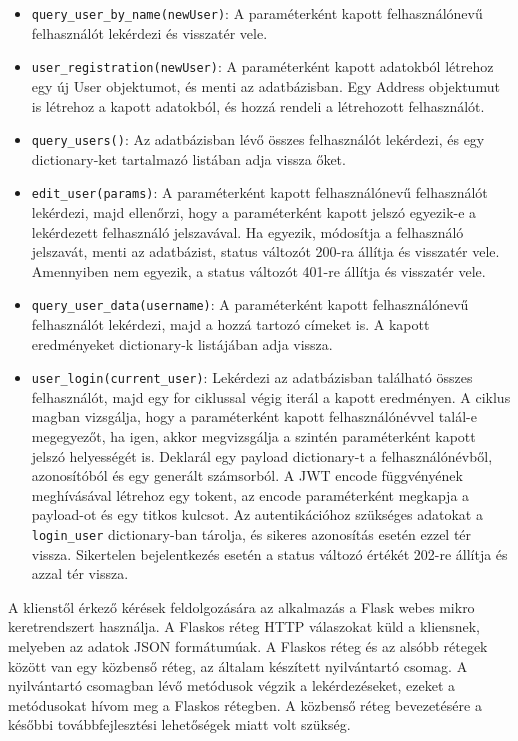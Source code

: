 \begin{itemize}
    \item \texttt{query\_user\_by\_name(newUser)}:
A paraméterként kapott felhasználónevű felhasználót lekérdezi és visszatér vele.
\item \texttt{user\_registration(newUser)}:
A paraméterként kapott adatokból létrehoz egy új User objektumot, és menti az adatbázisban. Egy Address objektumut is létrehoz a kapott adatokból, és hozzá rendeli a létrehozott felhasználót. 
\item \texttt{query\_users()}:
Az adatbázisban lévő összes felhasználót lekérdezi, és egy dic\-ti\-o\-nary-ket tartalmazó listában adja vissza őket.
\item \texttt{edit\_user(params)}:
A paraméterként kapott felhasználónevű felhasználót lekérdezi, majd ellenőrzi, hogy a paraméterként kapott jelszó egyezik-e a lekérdezett felhasználó jelszavával. Ha egyezik, módosítja a felhasználó jelszavát, menti az adatbázist, status változót 200-ra állítja és visszatér vele. Amennyiben nem egyezik, a status változót 401-re állítja és visszatér vele.
\item \texttt{query\_user\_data(username)}:
A paraméterként kapott felhasználónevű felhasználót lekérdezi, majd a hozzá tartozó címeket is. A kapott eredményeket dic\-ti\-o\-nary-k listájában adja vissza.
\item \texttt{user\_login(current\_user)}:
Lekérdezi az adatbázisban található összes felhasználót, majd egy for ciklussal végig iterál a kapott eredményen. A ciklus magban vizsgálja, hogy a paraméterként kapott felhasználónévvel talál-e megegyezőt, ha igen, akkor megvizsgálja a szintén paraméterként kapott jelszó helyességét is. Deklarál egy payload dic\-ti\-o\-nary-t a felhasználónévből, azonosítóból és egy generált számsorból. A JWT encode függvényének meghívásával létrehoz egy tokent, az encode paraméterként megkapja a payload-ot és egy titkos kulcsot. Az autentikációhoz szükséges adatokat a \texttt{login\_user} dictionary-ban tárolja, és sikeres azonosítás esetén ezzel tér vissza. Sikertelen bejelentkezés esetén a status változó értékét 202-re állítja és azzal tér vissza.
\end{itemize}


A klienstől érkező kérések feldolgozására az alkalmazás a Flask webes mikro keretrendszert használja. A Flaskos réteg HTTP válaszokat küld a kliensnek, melyeben az adatok JSON formátumúak. A Flaskos réteg és az alsóbb rétegek között van egy közbenső réteg, az általam készített nyilvántartó csomag. A nyilvántartó csomagban lévő metódusok végzik a lekérdezéseket, ezeket a metódusokat hívom meg a Flaskos rétegben. A közbenső réteg bevezetésére a későbbi továbbfejlesztési lehetőségek miatt volt szükség.

